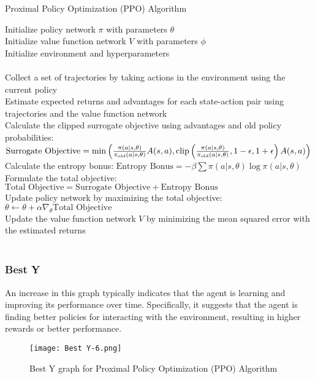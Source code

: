 \documentclass[preprint,12pt]{elsarticle}
\begin{document}
\begin{algorithm}[!htbp]
\caption{Proximal Policy Optimization (PPO) Algorithm}
\begin{algorithmic}
    \STATE Initialize policy network $\pi$ with parameters $\theta$\\
    \STATE Initialize value function network $V$ with parameters $\phi$\\
    \STATE Initialize environment and hyperparameters\\
    \\
        \STATE Collect a set of trajectories by taking actions in the environment using the current policy\\
        \STATE Estimate expected returns and advantages for each state-action pair using trajectories and the value function network\\
        \STATE Calculate the clipped surrogate objective using advantages and old policy probabilities:\\
        \STATE \quad $\text{Surrogate Objective} = \min\left(\frac{\pi(a|s, \theta)}{\pi_{\text{old}}(a|s, \theta)}A(s, a),\\
        \text{clip}\left(\frac{\pi(a|s, \theta)}{\pi_{\text{old}}(a|s, \theta)}, 1 - \epsilon, 1 + \epsilon\right)A(s, a)\right)$\\
        \STATE Calculate the entropy bonus: $\text{Entropy Bonus} = -\beta \sum \pi(a|s, \theta) \log \pi(a|s, \theta)$\\
        \STATE Formulate the total objective: $\text{Total Objective} = \text{Surrogate Objective} + \text{Entropy Bonus}$\\
        \STATE Update policy network by maximizing the total objective: $\theta \leftarrow \theta + \alpha \nabla_\theta \text{Total Objective}$\\
        \STATE Update the value function network $V$ by minimizing the mean squared error with the estimated returns\\
    \ENDFOR\\
\end{algorithmic}
\end{algorithm}

\subsubsection{Best Y}
An increase in this graph typically indicates that the agent is learning and improving its performance over time. Specifically, it suggests that the agent is finding better policies for interacting with the environment, resulting in higher rewards or better performance.
\graphicspath{ {./images/} }
\begin{figure}[!htbp]
  \centering
  \texttt{[image: Best Y-6.png]}
  \caption{Best Y graph for Proximal Policy Optimization (PPO) Algorithm}
  \label{fig:best-y-6}
\end{figure}\\
\end{document}
